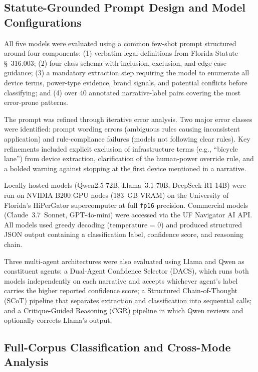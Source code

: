 \documentclass[numbered]{trbunofficial}
\begin{document}
\subsection{Statute-Grounded Prompt Design and Model Configurations}

All five models were evaluated using a common few-shot prompt structured around four components: (1) verbatim legal definitions from Florida Statute \S~316.003; (2) four-class schema with inclusion, exclusion, and edge-case guidance; (3) a mandatory extraction step requiring the model to enumerate all device terms, power-type evidence, brand signals, and potential conflicts before classifying; and (4) over 40 annotated narrative-label pairs covering the most error-prone patterns.

The prompt was refined through iterative error analysis. Two major error classes were identified: prompt wording errors (ambiguous rules causing inconsistent application) and rule-compliance failures (models not following clear rules). Key refinements included explicit exclusion of infrastructure terms (e.g., ``bicycle lane'') from device extraction, clarification of the human-power override rule, and a bolded warning against stopping at the first device mentioned in a narrative.

Locally hosted models (Qwen2.5-72B, Llama~3.1-70B, DeepSeek-R1-14B) were run on NVIDIA B200 GPU nodes (183~GB VRAM) on the University of Florida's HiPerGator supercomputer at full \texttt{fp16} precision. Commercial models (Claude~3.7~Sonnet, GPT-4o-mini) were accessed via the UF Navigator AI API. All models used greedy decoding (temperature = 0) and produced structured JSON output containing a classification label, confidence score, and reasoning chain.

Three multi-agent architectures were also evaluated using Llama and Qwen as constituent agents: a Dual-Agent Confidence Selector (DACS), which runs both models independently on each narrative and accepts whichever agent's label carries the higher reported confidence score; a Structured Chain-of-Thought (SCoT) pipeline that separates extraction and classification into sequential calls; and a Critique-Guided Reasoning (CGR) pipeline in which Qwen reviews and optionally corrects Llama's output. 

\subsection{Full-Corpus Classification and Cross-Mode Analysis}
\end{document}

